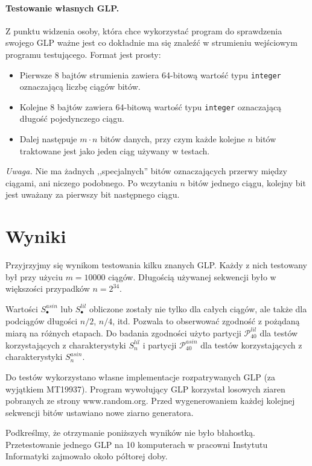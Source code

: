 \documentclass[a4paper,11pt,twoside]{book}
\newcommand{\Slil}[1]{S^{lil}_#1}
\newcommand{\Sasin}[1]{S^{asin}_#1}
\theoremstyle{definition}
\begin{document}
\paragraph{Testowanie własnych GLP.}
Z punktu widzenia osoby, która chce wykorzystać program do sprawdzenia swojego GLP ważne jest co dokładnie ma się znaleźć w strumieniu wejściowym programu testującego. Format jest prosty:
\begin{itemize}
 \item Pierwsze 8 bajtów strumienia zawiera 64-bitową wartość typu \texttt{integer} oznaczającą liczbę ciągów bitów.
 \item Kolejne 8 bajtów zawiera 64-bitową wartość typu \texttt{integer} oznaczającą długość pojedynczego ciągu.
 \item Dalej następuje $m \cdot n$ bitów danych, przy czym każde kolejne $n$ bitów traktowane jest jako jeden ciąg używany w testach.
\end{itemize}
\emph{Uwaga.} Nie ma żadnych ,,specjalnych'' bitów oznaczających przerwy między ciągami, ani niczego podobnego. Po wczytaniu $n$ bitów jednego ciągu, kolejny bit jest uważany za pierwszy bit następnego ciągu.


\section{Wyniki}
Przyjrzyjmy się wynikom testowania kilku znanych GLP. Każdy z nich testowany był przy użyciu $m = 10000$ ciągów. Długością używanej sekwencji było w większości przypadków $n=2^{34}$.  

Wartości $\Sasin{\bullet}$ lub $\Slil{\bullet}$ obliczone zostały nie tylko dla całych ciągów, ale także dla podciągów długości $n/2$, $n/4$, itd. Pozwala to obserwować zgodność z pożądaną miarą na różnych etapach. Do badania zgodności użyto partycji $\mathcal{P}^{lil}_{40}$ dla testów korzystających z charakterystyki $\Slil{n}$ i partycji $\mathcal{P}^{asin}_{40}$ dla testów korzystających z charakterystyki $\Sasin{n}$.

Do testów wykorzystano własne implementacje rozpatrywanych GLP (za wyjątkiem MT19937). Program wywołujący GLP korzystał losowych ziaren pobranych ze strony www.random.org. Przed wygenerowaniem każdej kolejnej sekwencji bitów ustawiano nowe ziarno generatora. 

Podkreślmy, że otrzymanie poniższych wyników nie było błahostką. Przetestowanie jednego GLP na 10 komputerach w pracowni Instytutu Informatyki zajmowało około półtorej doby.
\end{document}
